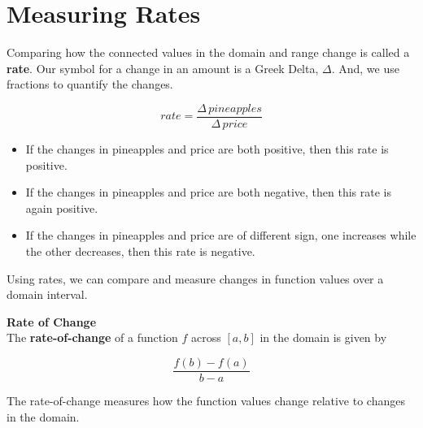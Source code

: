 \documentclass{ximera}
\begin{document}
\section{Measuring Rates}
Comparing how the connected values in the domain and range change is called a \textbf{rate}. Our symbol for a change in an amount is a Greek Delta, $\Delta$.  And, we use fractions to quantify the changes.

\[ rate = \frac{\Delta \, pineapples}{\Delta \, price}\]




\begin{itemize}
\item If the changes in pineapples and price are both positive, then this rate is positive.
\item If the changes in pineapples and price are both negative, then this rate is again positive.
\item If the changes in pineapples and price are of different sign, one increases while the other decreases, then this rate is negative.
\end{itemize}


Using rates, we can compare and measure changes in function values over a domain interval.


\begin{definition}  \textbf{\textcolor{green!50!black}{Rate of Change}} \\
The \textbf{rate-of-change} of a function $f$ across $[a, b]$ in the domain is given by

\[  \frac{f(b) - f(a)}{b - a}  \]


\end{definition}

The rate-of-change measures how the function values change relative to changes in the domain.
\end{document}
